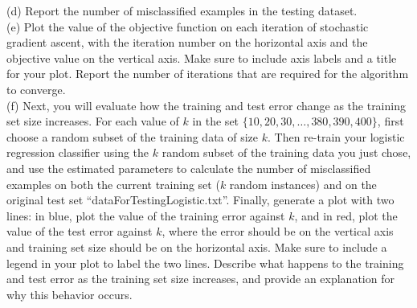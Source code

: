 \documentclass[a4paper]{article}
\theoremstyle{definition}
\begin{document}
(d) Report the number of misclassified examples in the testing dataset.\\

(e) Plot the value of the objective function on each iteration of stochastic gradient ascent, with the iteration number on the horizontal axis and the objective value on the vertical axis. Make sure to include axis labels and a title for your plot. Report the number of iterations that are required for the algorithm to converge. \\

(f) Next, you will evaluate how the training and test error change as the training set size increases. For each value of $k$ in the set $\{10, 20, 30, \ldots, 380, 390, 400\}$, first choose a random subset of the training data of size $k$.  Then re-train your logistic regression classifier using the $k$ random subset of the training data you just chose, and use the estimated parameters to calculate the number of misclassified examples on both the current training set ($k$ random instances) and on the original test set ``dataForTestingLogistic.txt''. Finally, generate a plot with two lines: in blue, plot the value of the training error against $k$, and in red, plot the value of the test error against $k$, where the error should be on the vertical axis and training set size should be on the horizontal axis. Make sure to include a legend in your plot to label the two lines. Describe what happens to the training and test error as the training set size increases, and provide an explanation for why this behavior occurs.








\end{document}
